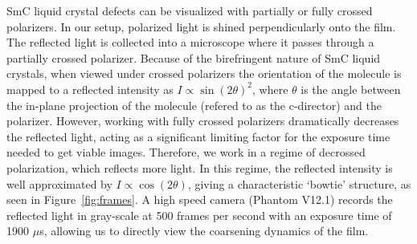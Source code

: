 \documentclass[twoside,twocolumn,9pt]{article}
\begin{document}

SmC liquid crystal defects can be visualized with partially or fully crossed polarizers. In our setup, polarized light is shined perpendicularly onto the film. The reflected light is collected into a microscope where it passes through a partially crossed polarizer. Because of the birefringent nature of SmC liquid crystals, when viewed under crossed polarizers the orientation of the molecule is mapped to a reflected intensity as $I \propto \sin(2\theta)^2$, where $\theta$ is the angle between the in-plane projection of the molecule (refered to as the c-director) and the polarizer. However, working with fully crossed polarizers dramatically decreases the reflected light, acting as a significant limiting factor for the exposure time needed to get viable images. Therefore, we work in a regime of decrossed polarization, which reflects more light. In this regime, the reflected intensity is well approximated by $I \propto \cos(2\theta)$, giving a characteristic `bowtie' structure, as seen in Figure~\ref{fig:frames}\cite{chattham_triclinic_2010}. A high speed camera (Phantom V12.1) records the reflected light in gray-scale at 500 frames per second with an exposure time of 1900 $\mu$s, allowing us to directly view the coarsening dynamics of the film.
\end{document}
